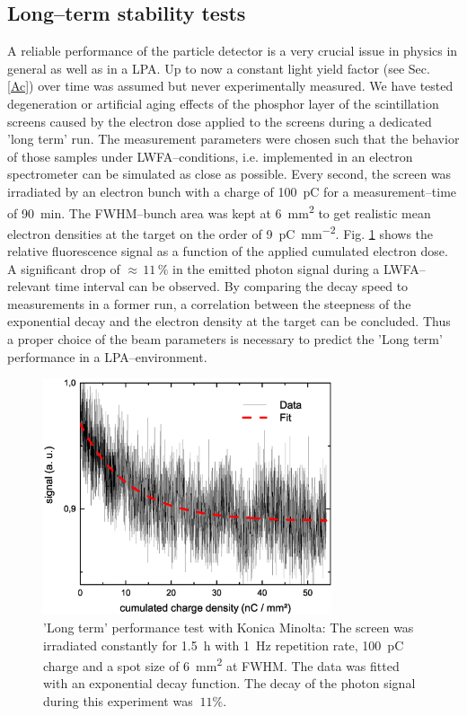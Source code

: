 \documentclass[%
preprint,
amsmath,
amssymb,
aip,
rsi, 
numerical,
floatfix,
]{revtex4-1}
\begin{document}
\subsection{\label{Ls}Long--term stability tests}
A reliable performance of the particle detector is a very crucial issue in physics in general as well as in a LPA.
Up to now a constant light yield factor (see Sec. \ref{Ac}) over time was assumed but never experimentally measured. 
We have tested degeneration or artificial aging effects of the phosphor layer of the scintillation screens caused by the electron dose applied to the screens during a dedicated 'long term' run.
The measurement parameters were chosen such that the behavior of those samples under LWFA--conditions, i.e. implemented in an electron spectrometer can be simulated as close as possible.
Every second, the screen was irradiated by an electron bunch with a charge of \SI{100}{\pico\coulomb} for a measurement--time of \SI{90}{\minute}.
The FWHM--bunch area was kept at \SI{6}{\square\milli\meter} to get realistic mean electron densities at the target on the order of \SI[per-mode=symbol]{9}{\pico\coulomb \per \square\milli\meter}. 
Fig. \ref{fig:Dt_Min_rel} shows the relative fluorescence signal as a function of the applied cumulated electron dose. 
A significant drop of $\approx\, 11\,\%$ in the emitted photon signal during a LWFA--relevant time interval can be observed.
By comparing the decay speed to measurements in a former run, a correlation between the steepness of the exponential decay and the electron density at the target can be concluded.
Thus a proper choice of the beam parameters is necessary to predict the 'Long term' performance in a LPA--environment.
 
\begin{figure}
\includegraphics[width=8.5cm]{./Figures/Dt_Min_rel}%
\caption{\label{fig:Dt_Min_rel} 'Long term' performance test with Konica Minolta: 
The screen was irradiated constantly for \SI{1.5}{\hour} with \SI{1}{\hertz} repetition rate, \SI{100}{\pico\coulomb} charge and a spot size of \SI{6}{\square\milli\meter} at FWHM. 
The data was fitted with an exponential decay function. 
The decay of the photon signal during this experiment was $~11\%$.}
\end{figure}
\end{document}

